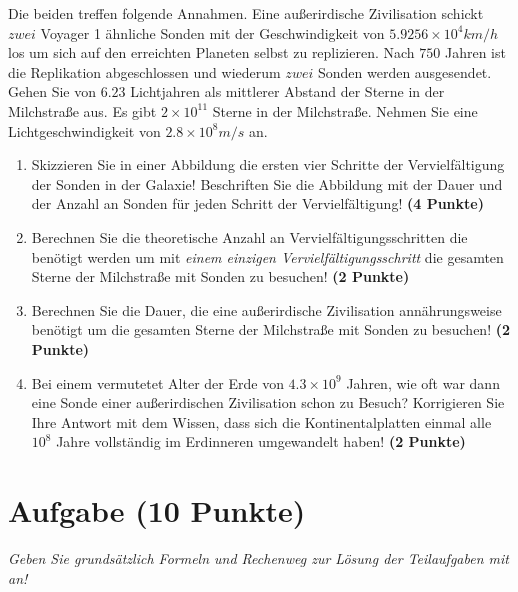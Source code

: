 \documentclass[a4paper, 9pt]{scrartcl}\usepackage[]{graphicx}\usepackage[]{xcolor}
\begin{document}
Die beiden treffen folgende Annahmen. Eine außerirdische Zivilisation schickt $zwei$ Voyager 1 ähnliche Sonden mit der Geschwindigkeit von $\ensuremath{5.9256\times 10^{4}}km/h$ los um sich auf den erreichten Planeten selbst zu replizieren. Nach $750$ Jahren ist die Replikation abgeschlossen und wiederum $zwei$ Sonden werden ausgesendet. Gehen Sie von $6.23$ Lichtjahren als mittlerer Abstand der Sterne in der Milchstraße aus. Es gibt $\ensuremath{2\times 10^{11}}$ Sterne in der Milchstraße. Nehmen Sie eine Lichtgeschwindigkeit von $\ensuremath{2.8\times 10^{8}}m/s$ an.

\begin{enumerate}
\item Skizzieren Sie in einer Abbildung die ersten vier Schritte der Vervielfältigung der Sonden in der Galaxie! Beschriften Sie die Abbildung mit der Dauer und der Anzahl an Sonden für jeden Schritt der Vervielfältigung! \textbf{(4 Punkte)}
\item Berechnen Sie die theoretische Anzahl an Vervielfältigungsschritten die benötigt werden um mit \textit{einem einzigen Vervielfältigungsschritt} die gesamten Sterne der Milchstraße mit Sonden zu besuchen! \textbf{(2 Punkte)}
\item Berechnen Sie die Dauer, die eine außerirdische Zivilisation annährungsweise benötigt um die gesamten Sterne der Milchstraße mit Sonden zu besuchen! \textbf{(2 Punkte)}
\item Bei einem vermutetet Alter der Erde von $\ensuremath{4.3\times 10^{9}}$ Jahren, wie oft war dann eine Sonde einer außerirdischen Zivilisation schon zu Besuch? Korrigieren Sie Ihre Antwort mit dem Wissen, dass sich die Kontinentalplatten einmal alle $\ensuremath{10^{8}}$ Jahre vollständig im Erdinneren umgewandelt haben! \textbf{(2 Punkte)}
\end{enumerate}


 
\clearpage

\section{Aufgabe \hfill (10 Punkte)}

\textit{Geben Sie grundsätzlich Formeln und Rechenweg zur Lösung der Teilaufgaben mit an!} \\[1Ex]
 
\end{document}
